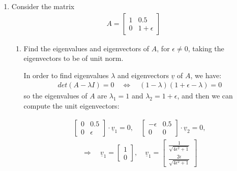 \documentclass[11pt,letterpaper]{article}
\begin{document}
\begin{enumerate}
\begin{enumerate}
    
\end{enumerate}

\newpage
\item 
Consider the matrix
\begin{align*}
    A = \begin{bmatrix}
                         1 & 0.5 \\
                         0 & 1+\epsilon
    \end{bmatrix}
\end{align*}

\begin{enumerate}
    \item 
    Find the eigenvalues and eigenvectors of $A$, for $ \epsilon \not = 0$, taking the eigenvectors to be of unit norm.
    \begin{flushleft}
        In order to find eigenvalues $\lambda$ and eigenvectors $\underline v$ of $A$, we have:
        \begin{align*}
            det(A - \lambda I) = 0 \quad \Leftrightarrow \quad (1-\lambda)(1+\epsilon-\lambda) = 0
        \end{align*}
        so the eigenvalues of $A$ are $\lambda_1 = 1$ and $\lambda_2 = 1+\epsilon$, and then we can compute the unit eigenvectors:
    \end{flushleft}

    \begin{align*}
            \begin{bmatrix}
                         0 & 0.5 \\
                         0 & \epsilon
            \end{bmatrix} \cdot \underline v_1 = 0, \quad
            \begin{bmatrix}
                         -\epsilon & 0.5 \\
                         0 & 0
            \end{bmatrix} \cdot \underline v_2 = 0,
    \end{align*}
    \begin{align*}
            \Rightarrow \quad 
            \underline v_1 = \begin{bmatrix}
                             1 \\
                             0 
                            \end{bmatrix}, \quad
            \underline v_1 = \begin{bmatrix}
                             \frac{1}{\sqrt{4\epsilon^2 + 1} } \\
                             \frac{2\epsilon}{\sqrt{4\epsilon^2 + 1}} 
                            \end{bmatrix}
    \end{align*}


\end{enumerate}
\end{enumerate}
\end{document}
